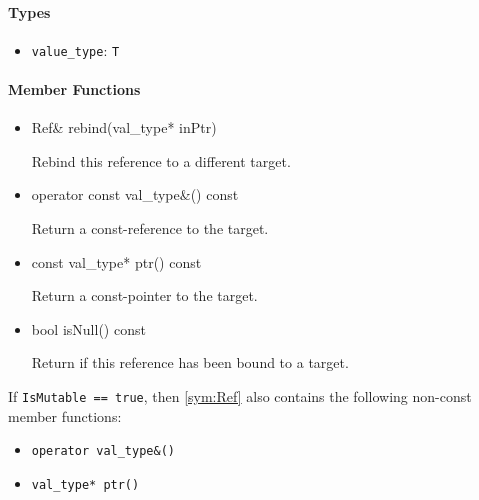 \paragraph{Types}

\begin{itemize}
	\item
		\texttt{value\_type}: \texttt{T}
\end{itemize}

\paragraph{Member Functions}

\begin{itemize}
	\item
		\begin{cppsnippet}
		Ref& rebind(val_type* inPtr)
		\end{cppsnippet}

		Rebind this reference to a different target.

	\item
		\begin{cppsnippet}
		operator const val_type&() const
		\end{cppsnippet}

		Return a const-reference to the target.

	\item
		\begin{cppsnippet}
		const val_type* ptr() const
		\end{cppsnippet}

		Return a const-pointer to the target.

	\item
		\begin{cppsnippet}
		bool isNull() const
		\end{cppsnippet}

		Return if this reference has been bound to a target.
\end{itemize}

If \texttt{IsMutable == true}, then \ref{sym:Ref} also contains the following non-const member functions:

\begin{itemize}
	\item \texttt{operator val\_type\&()}
	\item \texttt{val\_type* ptr()}
\end{itemize}

